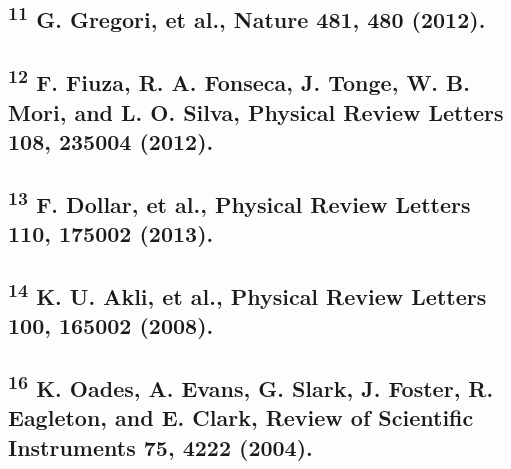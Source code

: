 \subsection{\texorpdfstring{\textsuperscript{11} G. Gregori, et al.,
Nature 481, 480
(2012).}{11 G. Gregori, et al., Nature 481, 480 (2012).}}\label{g.-gregori-et-al.-nature-481-480-2012.}

\subsection{\texorpdfstring{\textsuperscript{12} F. Fiuza, R. A.
Fonseca, J. Tonge, W. B. Mori, and L. O. Silva, Physical Review Letters
108, 235004
(2012).}{12 F. Fiuza, R. A. Fonseca, J. Tonge, W. B. Mori, and L. O. Silva, Physical Review Letters 108, 235004 (2012).}}\label{f.-fiuza-r.-a.-fonseca-j.-tonge-w.-b.-mori-and-l.-o.-silva-physical-review-letters-108-235004-2012.}

\subsection{\texorpdfstring{\textsuperscript{13} F. Dollar, et al.,
Physical Review Letters 110, 175002
(2013).}{13 F. Dollar, et al., Physical Review Letters 110, 175002 (2013).}}\label{f.-dollar-et-al.-physical-review-letters-110-175002-2013.}

\subsection{\texorpdfstring{\textsuperscript{14} K. U. Akli, et al.,
Physical Review Letters 100, 165002
(2008).}{14 K. U. Akli, et al., Physical Review Letters 100, 165002 (2008).}}\label{k.-u.-akli-et-al.-physical-review-letters-100-165002-2008.}


\subsection{\texorpdfstring{\textsuperscript{16} K. Oades, A. Evans, G.
Slark, J. Foster, R. Eagleton, and E. Clark, Review of Scientific
Instruments 75, 4222
(2004).}{16 K. Oades, A. Evans, G. Slark, J. Foster, R. Eagleton, and E. Clark, Review of Scientific Instruments 75, 4222 (2004).}}\label{k.-oades-a.-evans-g.-slark-j.-foster-r.-eagleton-and-e.-clark-review-of-scientific-instruments-75-4222-2004.}

